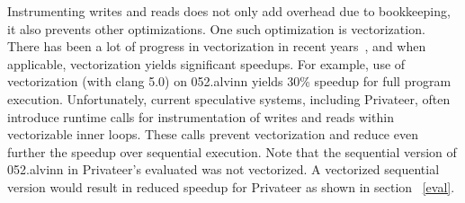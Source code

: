 Instrumenting writes and reads does not only add overhead due to bookkeeping, it
also prevents other optimizations.
%
One such optimization is vectorization.  There has been a lot of progress in
vectorization in recent years~\cite{.., llvm, MIT, inte}, and when applicable,
vectorization yields significant speedups.
%
For example, use of vectorization (with clang 5.0) on 052.alvinn yields 30\%
speedup for full program execution.  Unfortunately, current speculative systems,
including Privateer, often introduce runtime calls for instrumentation of writes
and reads within vectorizable inner loops. These calls prevent vectorization and
reduce even further the speedup over sequential execution.
%
%
Note that the sequential version of 052.alvinn in Privateer's evaluated was not
vectorized. A vectorized sequential version would result in reduced speedup for
Privateer as shown in section ~\ref{eval}.









